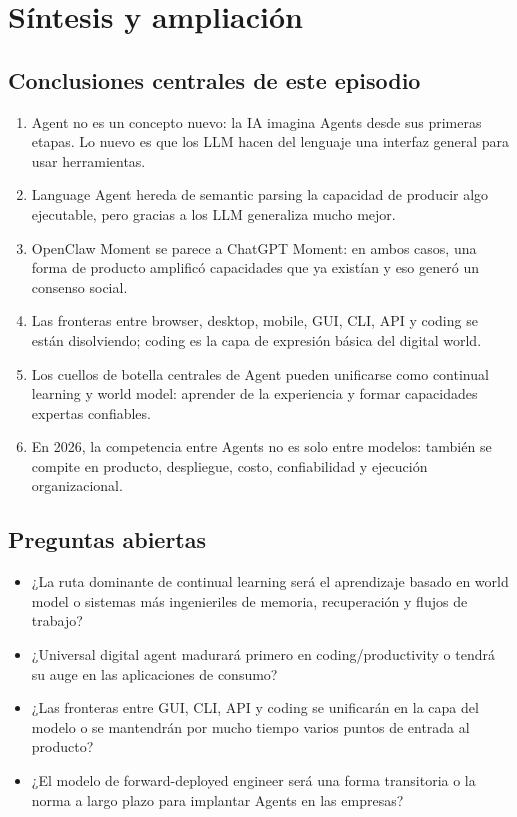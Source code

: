 \section{Síntesis y ampliación}

\subsection{Conclusiones centrales de este episodio}

\begin{enumerate}
\item Agent no es un concepto nuevo: la IA imagina Agents desde sus primeras etapas. Lo nuevo es que los LLM hacen del lenguaje una interfaz general para usar herramientas.
\item Language Agent hereda de semantic parsing la capacidad de producir algo ejecutable, pero gracias a los LLM generaliza mucho mejor.
\item OpenClaw Moment se parece a ChatGPT Moment: en ambos casos, una forma de producto amplificó capacidades que ya existían y eso generó un consenso social.
\item Las fronteras entre browser, desktop, mobile, GUI, CLI, API y coding se están disolviendo; coding es la capa de expresión básica del digital world.
\item Los cuellos de botella centrales de Agent pueden unificarse como continual learning y world model: aprender de la experiencia y formar capacidades expertas confiables.
\item En 2026, la competencia entre Agents no es solo entre modelos: también se compite en producto, despliegue, costo, confiabilidad y ejecución organizacional.
\end{enumerate}

\subsection{Preguntas abiertas}

\begin{itemize}
\item ¿La ruta dominante de continual learning será el aprendizaje basado en world model o sistemas más ingenieriles de memoria, recuperación y flujos de trabajo?
\item ¿Universal digital agent madurará primero en coding/productivity o tendrá su auge en las aplicaciones de consumo?
\item ¿Las fronteras entre GUI, CLI, API y coding se unificarán en la capa del modelo o se mantendrán por mucho tiempo varios puntos de entrada al producto?
\item ¿El modelo de forward-deployed engineer será una forma transitoria o la norma a largo plazo para implantar Agents en las empresas?
\end{itemize}

